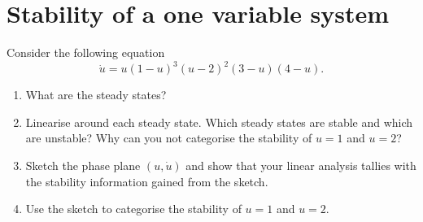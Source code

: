 \documentclass[]{article}
\newcommand{\bb}{\begin{equation}}
\newcommand{\ee}{\end{equation}}
\begin{document}
\section{Stability of a one variable system}
Consider the following equation
\bb
\dot{u}=u(1-u)^3(u-2)^2(3-u)(4-u).\label{Stability_test}
\ee
\begin{enumerate}
\item What are the steady states?
\item Linearise around each steady state. Which steady states are stable and which are unstable? Why can you not categorise the stability of $u=1$ and $u=2$?
\item Sketch the phase plane $(u,\dot{u})$ and show that your linear analysis tallies with the stability information gained from the sketch.
\item Use the sketch to categorise the stability of $u=1$ and $u=2$.
\end{enumerate}
\end{document}
